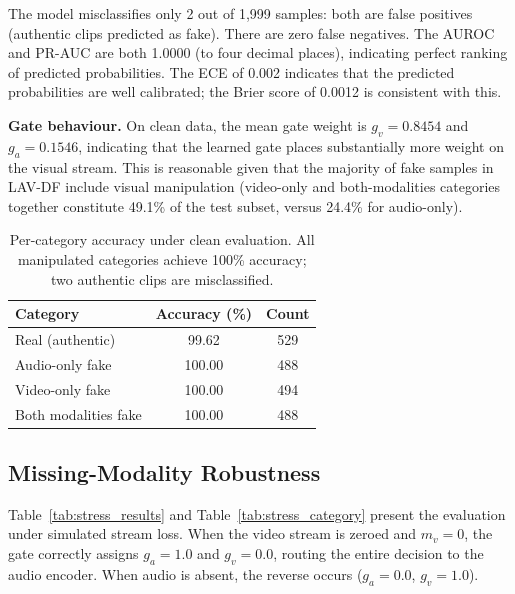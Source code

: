 \documentclass[conference]{IEEEtran}
\begin{document}
The model misclassifies only 2 out of 1{,}999 samples: both are false positives (authentic clips predicted as fake). There are zero false negatives. The AUROC and PR-AUC are both 1.0000 (to four decimal places), indicating perfect ranking of predicted probabilities. The ECE of 0.002 indicates that the predicted probabilities are well calibrated; the Brier score of 0.0012 is consistent with this.

\textbf{Gate behaviour.} On clean data, the mean gate weight is $g_v = 0.8454$ and $g_a = 0.1546$, indicating that the learned gate places substantially more weight on the visual stream. This is reasonable given that the majority of fake samples in LAV-DF include visual manipulation (video-only and both-modalities categories together constitute 49.1\% of the test subset, versus 24.4\% for audio-only).

\begin{table}[t]
\centering
\caption{Per-category accuracy under clean evaluation. All manipulated categories achieve 100\% accuracy; two authentic clips are misclassified.}
\label{tab:clean_category}
\begin{tabular}{lcc}
\toprule
\textbf{Category} & \textbf{Accuracy (\%)} & \textbf{Count} \\
\midrule
Real (authentic)         & 99.62 & 529 \\
Audio-only fake          & 100.00 & 488 \\
Video-only fake          & 100.00 & 494 \\
Both modalities fake     & 100.00 & 488 \\
\bottomrule
\end{tabular}
\end{table}

\subsection{Missing-Modality Robustness}

Table~\ref{tab:stress_results} and Table~\ref{tab:stress_category} present the evaluation under simulated stream loss. When the video stream is zeroed and $m_v = 0$, the gate correctly assigns $g_a = 1.0$ and $g_v = 0.0$, routing the entire decision to the audio encoder. When audio is absent, the reverse occurs ($g_a = 0.0$, $g_v = 1.0$).
\end{document}
